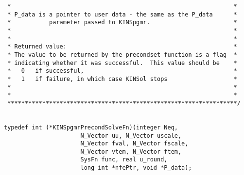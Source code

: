\documentclass[11pt]{article}
\begin{document}
\begin{verbatim}
 *                                                                *
 * P_data is a pointer to user data - the same as the P_data      *
 *           parameter passed to KINSpgmr.                        *
 *                                                                *
 *                                                                *
 * Returned value:                                                *
 * The value to be returned by the precondset function is a flag  *
 * indicating whether it was successful.  This value should be    *
 *   0   if successful,                                           *
 *   1   if failure, in which case KINSol stops                   *
 *                                                                *
 *                                                                *
 ******************************************************************/
  

typedef int (*KINSpgmrPrecondSolveFn)(integer Neq,
                      N_Vector uu, N_Vector uscale, 
                      N_Vector fval, N_Vector fscale, 
                      N_Vector vtem, N_Vector ftem,
                      SysFn func, real u_round,
                      long int *nfePtr, void *P_data);
 

\end{verbatim}
\end{document}
